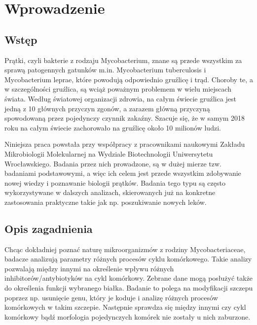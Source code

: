 \documentclass[declaration,shortabstract,mgr]{iithesis}
\author         {Artur Rosa}
\begin{document}

\chapter{Wprowadzenie}



\section{Wstęp}


Prątki, czyli bakterie z rodzaju Mycobacterium, znane są przede wszystkim za sprawą patogennych gatunków m.in. Mycobacterium tuberculosis i Mycobacterium leprae, które powodują odpowiednio gruźlicę i trąd. Choroby te, a w szczególności gruźlica, są wciąż poważnym problemem w wielu miejscach świata. Według światowej organizacji zdrowia, na całym świecie gruźlica jest jedną z 10 głównych przyczyn zgonów, a zarazem główną przyczyną spowodowaną przez pojedynczy czynnik zakaźny\cite{who-stats}. Szacuje się, że w samym 2018 roku na całym świecie zachorowało na gruźlicę około 10 milionów ludzi.

Niniejsza praca powstała przy współpracy z pracownikami naukowymi Zakładu Mikrobiologii Molekularnej na Wydziale Biotechnologii Uniwersytetu Wrocławskiego. Badania przez nich prowadzone, są w dużej mierze tzw. badaniami podstawowymi, a więc ich celem jest przede wszystkim zdobywanie nowej wiedzy i poznawanie biologii prątków. Badania tego typu są często wykorzystywane w dalszych analizach, skierowanych już na konkretne zastosowania praktyczne takie jak np. poszukiwanie nowych leków.


\section{Opis zagadnienia}
\label{sec:intro-description}

Chcąc dokładniej poznać naturę mikroorganizmów z rodziny Mycobacteriaceae, badacze analizują parametry różnych procesów cyklu komórkowego.
Takie analizy pozwalają między innymi na określenie wpływu różnych inhibitorów/antybiotyków na cykl komórkowy\cite{paper:watching-dna-replication}.
Zebrane dane mogą posłużyć także do określenia funkcji wybranego białka\cite{paper:protein-responsibility}.
Badanie to polega na modyfikacji szczepu poprzez np. usunięcie genu, który je koduje i analizę różnych procesów komórkowych w takim szczepie.
Następnie sprawdza się między innymi czy cykl komórkowy bądź morfologia pojedynczych komórek nie zostały u nich zaburzone.
\end{document}

